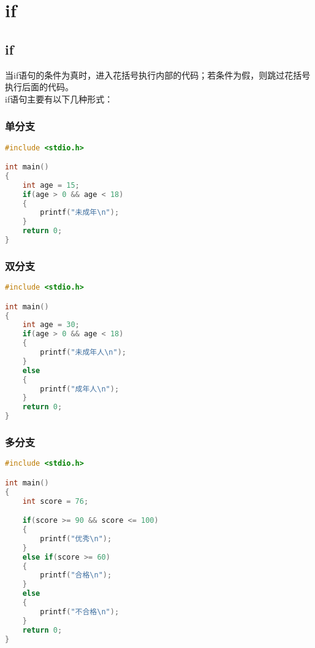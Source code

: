 \newpage

\section{if}

\subsection{if}

当if语句的条件为真时，进入花括号执行内部的代码；若条件为假，则跳过花括号执行后面的代码。\\

if语句主要有以下几种形式：

\subsubsection{单分支}

\vspace{-1cm}

\begin{lstlisting}[language=C]
#include <stdio.h>

int main()
{
	int age = 15;
	if(age > 0 && age < 18)
	{
		printf("未成年\n");
	}
	return 0;
}
\end{lstlisting}

\subsubsection{双分支}

\vspace{-1cm}

\begin{lstlisting}[language=C]
#include <stdio.h>

int main()
{
	int age = 30;
	if(age > 0 && age < 18)
	{
		printf("未成年人\n");
	}
	else
	{
		printf("成年人\n");
	}
	return 0;
}
\end{lstlisting}

\subsubsection{多分支}

\vspace{-1cm}

\begin{lstlisting}[language=C]
#include <stdio.h>

int main()
{
	int score = 76;

	if(score >= 90 && score <= 100)
	{
		printf("优秀\n");
	}
	else if(score >= 60)
	{
		printf("合格\n");
	}
	else
	{
		printf("不合格\n");
	}
	return 0;
}
\end{lstlisting}

